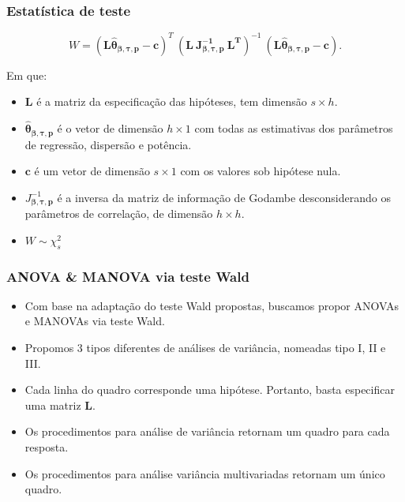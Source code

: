 \documentclass[10pt,
  aspectratio=169,
  serif,
  mathserif,
  professionalfont,
  compress,
  handout,
  ]{beamer}\usepackage[]{graphicx}\usepackage[]{color}
\begin{document}

\begin{frame}
\frametitle{Estatística de teste}

$$W = (\boldsymbol{L\hat\theta_{\beta,\tau,p}} - \boldsymbol{c})^T \ (\boldsymbol{L \ J_{\boldsymbol{{\beta,\tau,p}}}^{-1} \ L^T})^{-1} \ (\boldsymbol{L\hat\theta_{\beta,\tau,p}} - \boldsymbol{c}).$$

Em que: 

\begin{itemize}
  \item $\boldsymbol{L}$ é a matriz da especificação das hipóteses, tem dimensão $s \times h$. 

  \item $\boldsymbol{\hat\theta_{\beta,\tau,p}}$ é o vetor de dimensão $h \times 1$ com todas as estimativas dos parâmetros de regressão, dispersão e potência. 

  \item $\boldsymbol{c}$ é um vetor de dimensão $s \times 1$ com os valores sob hipótese nula. 

  \item $J_{\boldsymbol{{\beta,\tau,p}}}^{-1}$ é a inversa da matriz de informação de Godambe desconsiderando os parâmetros de correlação, de dimensão $h \times h$. 
  
  \item $W \sim \chi^2_s$

\end{itemize}

\end{frame}


\begin{frame}

\frametitle{ANOVA \& MANOVA via teste Wald}

\begin{itemize}
    \itemsep 2ex

  \item Com base na adaptação do teste Wald propostas, buscamos propor ANOVAs e MANOVAs via teste Wald.

  \item Propomos 3 tipos diferentes de análises de variância, nomeadas tipo I, II e III.

  \item Cada linha do quadro corresponde uma hipótese. Portanto, basta especificar uma matriz $\boldsymbol{L}$.

  \item Os procedimentos para análise de variância retornam um quadro para cada resposta.

  \item Os procedimentos para análise variância multivariadas retornam um único quadro. 
\end{itemize}

\end{frame}
\end{document}
